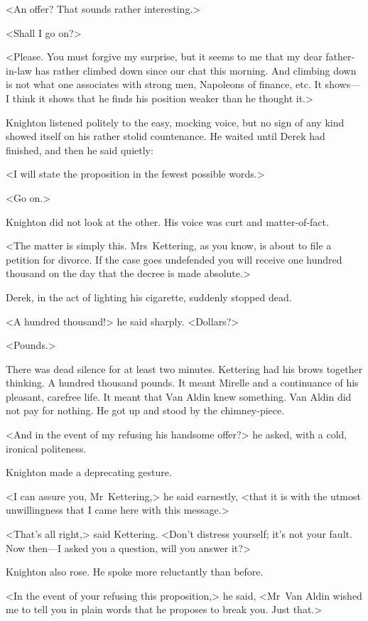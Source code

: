 <An offer? That sounds rather interesting.>

<Shall I go on?>

<Please. You must forgive my surprise, but it seems to me that my dear father-in-law has rather climbed down since our chat this morning. And climbing down is not what one associates with strong men, Napoleons of finance, etc. It shows—I think it shows that he finds his position weaker than he thought it.>

Knighton listened politely to the easy, mocking voice, but no sign of any kind showed itself on his rather stolid countenance. He waited until Derek had finished, and then he said quietly:

<I will state the proposition in the fewest possible words.>

<Go on.>

Knighton did not look at the other. His voice was curt and matter-of-fact.

<The matter is simply this. Mrs~Kettering, as you know, is about to file a petition for divorce. If the case goes undefended you will receive one hundred thousand on the day that the decree is made absolute.>

Derek, in the act of lighting his cigarette, suddenly stopped dead.

<A hundred thousand!> he said sharply. <Dollars?>

<Pounds.>

There was dead silence for at least two minutes. Kettering had his brows together thinking. A hundred thousand pounds. It meant Mirelle and a continuance of his pleasant, carefree life. It meant that Van Aldin knew something. Van Aldin did not pay for nothing. He got up and stood by the chimney-piece.

<And in the event of my refusing his handsome offer?> he asked, with a cold, ironical politeness.

Knighton made a deprecating gesture.

<I can assure you, Mr~Kettering,> he said earnestly, <that it is with the utmost unwillingness that I came here with this message.>

<That's all right,> said Kettering. <Don't distress yourself; it's not your fault. Now then—I asked you a question, will you answer it?>

Knighton also rose. He spoke more reluctantly than before.

<In the event of your refusing this proposition,> he said, <Mr~Van Aldin wished me to tell you in plain words that he proposes to break you. Just that.>

